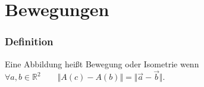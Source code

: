 \section{Bewegungen}
%
%
%
\subsubsection{Definition}
Eine Abbildung heißt Bewegung oder Isometrie wenn $\forall a,b \in \mathbb{R}^{2}\qquad \Vert A(c) - A(b) \Vert = \Vert \vec{a}-\vec{b}\Vert$.